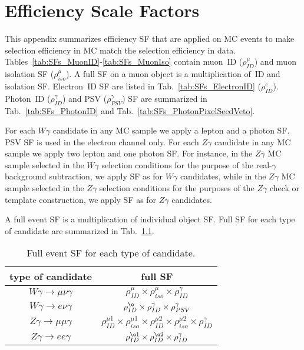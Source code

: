 \chapter{Efficiency Scale Factors}
\label{sec:SFsTables}

This appendix summarizes efficiency SF that are applied on MC events to make selection efficiency in MC match the selection efficiency in data. Tables~\ref{tab:SFs_MuonID}-\ref{tab:SFs_MuonIso} contain muon~ID ($\rho^{\mu}_{ID}$) and muon isolation SF ($\rho^{\mu}_{iso}$). A full SF on a muon object is a multiplication of~ID and isolation SF. Electron~ID SF are listed in Tab.~\ref{tab:SFs_ElectronID} ($\rho^{e}_{ID}$). Photon~ID ($\rho^{\gamma}_{ID}$) and PSV ($\rho^{\gamma}_{PSV}$) SF are summarized in Tab.~\ref{tab:SFs_PhotonID} and Tab.~\ref{tab:SFs_PhotonPixelSeedVeto}.

For each $W\gamma$ candidate in any MC sample we apply a lepton and a photon SF. PSV SF is used in the electron channel only. For each $Z\gamma$ candidate in any MC sample we apply two lepton and one photon SF. For instance, in the $Z\gamma$ MC sample selected in the $W\gamma$ selection conditions for the purpose of the real-$\gamma$ background subtraction, we apply SF as for $W\gamma$ candidates, while in the $Z\gamma$ MC sample selected in the $Z\gamma$ selection conditions for the purposes of the $Z\gamma$ check or template construction, we apply SF as for $Z\gamma$ candidates.

A full event SF is a multiplication of individual object SF. Full SF for each type of candidate are summarized in Tab.~\ref{tab:SFs_Applied}.

\begin{table}[h]
  \footnotesize
  \begin{center}
  \caption{Full event SF for each type of candidate.} 
   \begin{tabular}{|c|c|}
 type of candidate                  &   full SF\\ \hline
 $W\gamma\rightarrow\mu\nu\gamma$   &   $\rho^{\mu}_{ID} \times \rho^{\mu}_{iso} \times \rho^{\gamma}_{ID}$    \\ \hline
 $W\gamma\rightarrow e\nu\gamma$    &   $\rho^{\e}_{ID} \times \rho^{\gamma}_{ID}\times \rho^{\gamma}_{PSV}$       \\ \hline
 $Z\gamma\rightarrow\mu\mu\gamma$   &   $\rho^{\mu1}_{ID} \times \rho^{\mu1}_{iso} \times \rho^{\mu2}_{ID} \times \rho^{\mu2}_{iso} \times \rho^{\gamma}_{ID}$      \\ \hline
 $Z\gamma\rightarrow ee\gamma$      &   $\rho^{\e1}_{ID} \times \rho^{\e2}_{ID} \times \rho^{\gamma}_{ID}$      \\ \hline
  \end{tabular}
  \label{tab:SFs_Applied}
  \end{center}
\end{table}

